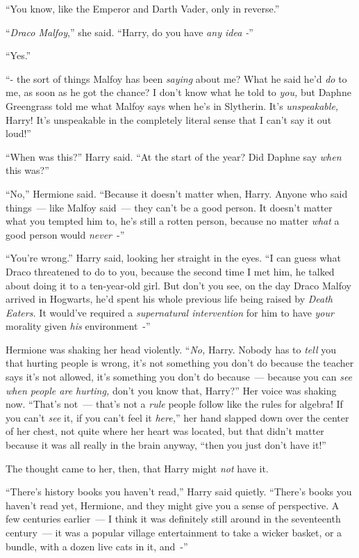 ``You know, like the Emperor and Darth Vader, only in reverse.''

``\emph{Draco Malfoy},'' she said. ``Harry, do you have \emph{any idea -}''

``Yes.''

``- the sort of things Malfoy has been \emph{saying} about me? What he said he'd \emph{do} to me, as soon as he got the chance? I don't know what he told to \emph{you,} but Daphne Greengrass told me what Malfoy says when he's in Slytherin. It's \emph{unspeakable,} Harry! It's unspeakable in the completely literal sense that I can't say it out loud!''

``When was this?'' Harry said. ``At the start of the year? Did Daphne say \emph{when} this was?''

``No,'' Hermione said. ``Because it doesn't matter when, Harry. Anyone who said things~--- like Malfoy said~--- they can't be a good person. It doesn't matter what you tempted him to, he's still a rotten person, because no matter \emph{what} a good person would \emph{never}~-''

``You're wrong.'' Harry said, looking her straight in the eyes. ``I can guess what Draco threatened to do to you, because the second time I met him, he talked about doing it to a ten-year-old girl. But don't you see, on the day Draco Malfoy arrived in Hogwarts, he'd spent his whole previous life being raised by \emph{Death Eaters.} It would've required a \emph{supernatural intervention} for him to have \emph{your} morality given \emph{his} environment~-''

Hermione was shaking her head violently. ``\emph{No,} Harry. Nobody has to \emph{tell} you that hurting people is wrong, it's not something you don't do because the teacher says it's not allowed, it's something you don't do because~--- because you can \emph{see when people are hurting,} don't you know that, Harry?'' Her voice was shaking now. ``That's not~--- that's not a \emph{rule} people follow like the rules for algebra! If you can't \emph{see} it, if you can't feel it \emph{here,}'' her hand slapped down over the center of her chest, not quite where her heart was located, but that didn't matter because it was all really in the brain anyway, ``then you just don't have it!''

The thought came to her, then, that Harry might \emph{not} have it.

``There's history books you haven't read,'' Harry said quietly. ``There's books you haven't read yet, Hermione, and they might give you a sense of perspective. A few centuries earlier~--- I think it was definitely still around in the seventeenth century~--- it was a popular village entertainment to take a wicker basket, or a bundle, with a dozen live cats in it, and~-''

